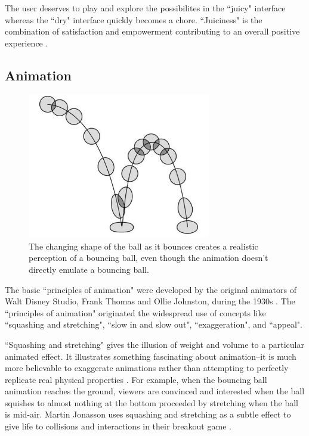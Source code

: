 The user deserves to play and explore the possibilites in the ``juicy" interface whereas the ``dry" interface quickly becomes a chore. ``Juiciness" is the combination of satisfaction and empowerment contributing to an overall positive experience \cite{atanasov}.


\subsection{Animation}

\begin{figure}
\begin{center}
\includegraphics[width=80mm]{images/bounce.pdf}
\caption[Basic animation of a bouncing ball]{The changing shape of the ball as it bounces creates a realistic perception of a bouncing ball, even though the animation doesn’t directly emulate a bouncing ball.}
\label{fig:bounce}
\end{center}
\end{figure}

The basic ``principles of animation" were developed by the original animators of Walt Disney Studio, Frank Thomas and Ollie Johnston, during the 1930s \cite{thomas1981disney}. The ``principles of animation" originated the widespread use of concepts like ``squashing and stretching", ``slow in and slow out", ``exaggeration", and ``appeal". 

``Squashing and stretching" gives the illusion of weight and volume to a particular animated effect. It illustrates something fascinating about animation--it is much more believable to exaggerate animations rather than attempting to perfectly replicate real physical properties \cite{swink2009game}. For example, when the bouncing ball animation reaches the ground, viewers are convinced and interested when the ball squishes to almost nothing at the bottom proceeded by stretching when the ball is mid-air. Martin Jonasson uses squashing and stretching as a subtle effect to give life to collisions and interactions in their breakout game \cite{juiceitorloseit}.

